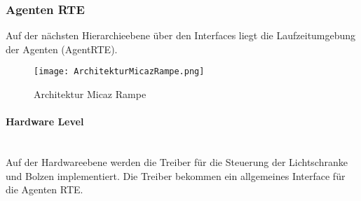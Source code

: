 \subsubsection{Agenten RTE}
Auf der nächsten Hierarchieebene über den Interfaces liegt die Laufzeitumgebung der Agenten (AgentRTE).
\begin{figure}[h!]
	\centering
		\texttt{[image: ArchitekturMicazRampe.png]}
	\caption{Architektur Micaz Rampe\cite{Stasch:Hahn}}
	\label{ArchitekturMicazRampe}
\end{figure}
\paragraph{Hardware Level}\mbox{} \\
Auf der Hardwareebene werden die Treiber für die Steuerung der Lichtschranke und Bolzen implementiert. Die Treiber bekommen ein
allgemeines Interface für die Agenten RTE.